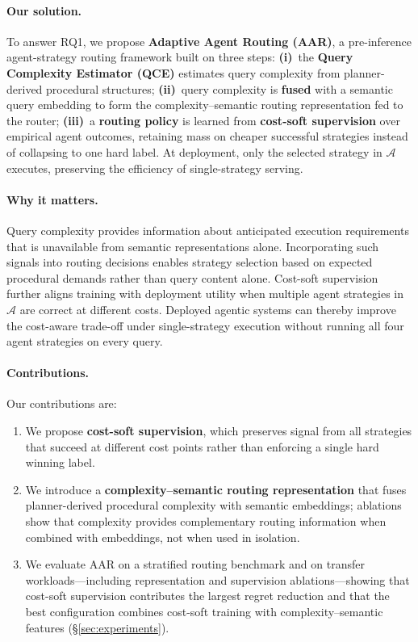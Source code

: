 \paragraph{Our solution.}
To answer RQ1, we propose \textbf{Adaptive Agent Routing (AAR)}, a pre-inference
agent-strategy routing framework built on three steps:
\textbf{(i)}~the \textbf{Query Complexity Estimator (QCE)} estimates query complexity from
planner-derived procedural structures;
\textbf{(ii)}~query complexity is \textbf{fused} with a semantic query embedding to form the
complexity--semantic routing representation fed to the router;
\textbf{(iii)}~a \textbf{routing policy} is learned from \textbf{cost-soft supervision} over
empirical agent outcomes, retaining mass on cheaper successful strategies instead of collapsing
to one hard label.
At deployment, only the selected strategy in $\mathcal{A}$ executes, preserving the efficiency of
single-strategy serving.

\paragraph{Why it matters.}
Query complexity provides information about anticipated execution requirements that is
unavailable from semantic representations alone.
Incorporating such signals into routing decisions enables strategy selection based on expected
procedural demands rather than query content alone.
Cost-soft supervision further aligns training with deployment utility when multiple agent
strategies in $\mathcal{A}$ are correct at different costs.
Deployed agentic systems can thereby improve the cost-aware trade-off under single-strategy
execution without running all four agent strategies on every query.

\paragraph{Contributions.}
Our contributions are:
\begin{enumerate}
  \item We propose \textbf{cost-soft supervision}, which preserves signal from all strategies
    that succeed at different cost points rather than enforcing a single hard winning label.
  \item We introduce a \textbf{complexity--semantic routing representation} that fuses
    planner-derived procedural complexity with semantic embeddings; ablations show that
    complexity provides complementary routing information when combined with embeddings, not
    when used in isolation.
  \item We evaluate AAR on a stratified routing benchmark and on transfer workloads---including
    representation and supervision ablations---showing that cost-soft supervision contributes
    the largest regret reduction and that the best configuration combines cost-soft training
    with complexity--semantic features (\S\ref{sec:experiments}).
\end{enumerate}
